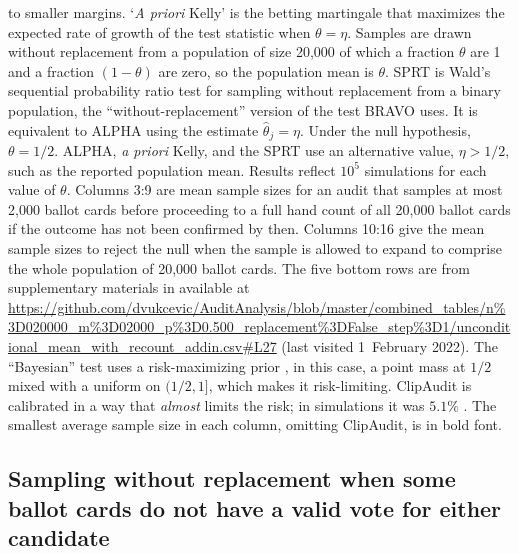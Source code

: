 \documentclass[aoas]{imsart}
\begin{document}
\begin{table}
{to smaller margins.
`\emph{A priori} Kelly' is the betting martingale that maximizes the expected rate of growth of the test statistic when $\theta = \eta$.
Samples are drawn without replacement from a population of size 20,000 of which a fraction $\theta$ are 1 and a fraction $(1-\theta)$
are zero, so the population mean is $\theta$.
SPRT is Wald's sequential probability ratio test for sampling without replacement from a binary population, the ``without-replacement''
version of the test BRAVO uses.
It is equivalent to ALPHA using the estimate $\hat{\theta}_j = \eta$.
Under the null hypothesis, $\theta=1/2$. 
ALPHA, \emph{a priori} Kelly, and the SPRT use an alternative value, $\eta > 1/2$, such as the reported population mean. 
Results reflect $10^5$ simulations for each value of $\theta$.
Columns 3:9 are mean sample sizes for an audit that samples at most 2,000 ballot cards before proceeding to
a full hand count of all 20,000 ballot cards if the outcome has not been confirmed by then. 
Columns 10:16 give the mean sample sizes to reject the null when the sample is allowed to
expand to comprise the whole population of 20,000 ballot cards.
The five bottom rows are from supplementary materials in \citet{huangEtal20} available at 
\url{https://github.com/dvukcevic/AuditAnalysis/blob/master/combined_tables/n\%3D020000_m\%3D02000_p\%3D0.500_replacement\%3DFalse_step\%3D1/unconditional_mean_with_recount_addin.csv\#L27} (last visited 1~February 2022).
The ``Bayesian'' test uses a risk-maximizing prior \citep{vora19}, in this case, a point mass at $1/2$ mixed with a uniform on $(1/2, 1]$, 
which makes it risk-limiting.
ClipAudit \citep{rivest17} is calibrated in a way that \emph{almost} limits the risk; in simulations it was $5.1\%$ \citep{huangEtal20}.
The smallest average sample size in each column, omitting ClipAudit, is in bold font.
}
\end{table}

\subsection{Sampling without replacement when some ballot cards do not have a valid vote for either candidate} \label{sec:blanks}
\end{document}
